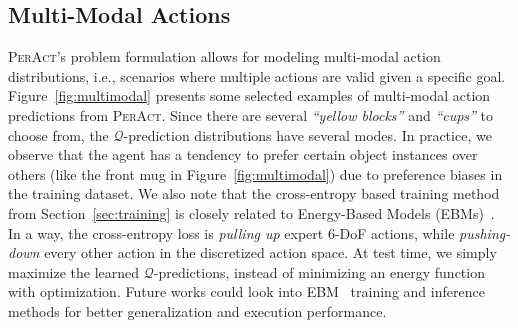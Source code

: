 \documentclass{article}
\newcommand{\secref}[1]{Section~\ref{#1}}
\newcommand{\figref}[1]{Figure~\ref{#1}}
\newcommand{\ie}{\textrm{i.e.,}\xspace}
\newcommand{\model}{\textsc{PerAct}}
\begin{document}
\subsection{Multi-Modal Actions}
\model's problem formulation allows for modeling multi-modal action distributions, \ie scenarios where multiple actions are valid given a specific goal. \figref{fig:multimodal} presents some selected examples of multi-modal action predictions from \model. Since there are several \textit{``yellow blocks''} and \textit{``cups''} to choose from, the $\mathcal{Q}$-prediction distributions have several modes. In practice, we observe that the agent has a tendency to prefer certain object instances over others (like the front mug in \figref{fig:multimodal}) due to preference biases in the training dataset. We also note that the cross-entropy based training method from \secref{sec:training} is closely related to Energy-Based Models (EBMs)~\citep{lecun2006tutorial,florence2022implicit}. In a way, the cross-entropy loss is \textit{pulling up} expert 6-DoF actions, while \textit{pushing-down} every other action in the discretized action space. At test time, we simply maximize the learned $\mathcal{Q}$-predictions, instead of minimizing an energy function with optimization. Future works could look into EBM~\citep{florence2022implicit} training and inference methods for better generalization and execution performance.
\end{document}
